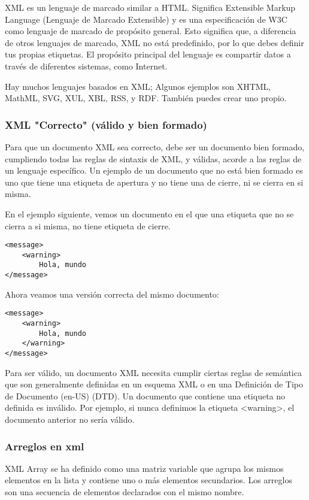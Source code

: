 \begin{enumerate}
\cite{mdn} XML es un lenguaje de marcado similar a HTML. Significa Extensible Markup Language (Lenguaje de Marcado Extensible) y es una especificación de W3C como lenguaje de marcado de propósito general. Esto significa que, a diferencia de otros lenguajes de marcado, XML no está predefinido, por lo que debes definir tus propias etiquetas. El propósito principal del lenguaje es compartir datos a través de diferentes sistemas, como Internet.

Hay muchos lenguajes basados en XML; Algunos ejemplos son XHTML, MathML, SVG, XUL, XBL, RSS, y RDF. También puedes crear uno propio.

\subsubsection{XML "Correcto" (válido y bien formado)}

Para que un documento XML sea correcto, debe ser un documento bien formado, cumpliendo todas las reglas de sintaxis de XML, y válidas, acorde a las reglas de un lenguaje específico. Un ejemplo de un documento que no está bien formado es uno que tiene una etiqueta de apertura y no tiene una de cierre, ni se cierra en si misma.

En el ejemplo siguiente, vemos un documento en el que una etiqueta que no se cierra a si misma, no tiene etiqueta de cierre.

\begin{lstlisting}
<message>
	<warning>
		Hola, mundo
</message>
\end{lstlisting}

Ahora veamos una versión correcta del mismo documento:

\begin{lstlisting}
<message>
	<warning>
		Hola, mundo
	</warning>
</message>
\end{lstlisting}

Para ser válido, un documento XML necesita cumplir ciertas reglas de semántica que son generalmente definidas en un esquema XML o en una Definición de Tipo de Documento (en-US) (DTD). Un documento que contiene una etiqueta no definida es inválido. Por ejemplo, si nunca definimos la etiqueta <warning>, el documento anterior no sería válido.

\subsubsection{Arreglos en xml}

XML Array se ha definido como una matriz variable que agrupa los mismos elementos en la lista y contiene uno o más elementos secundarios. Los arreglos son una secuencia de elementos declarados con el mismo nombre.


\end{enumerate}
